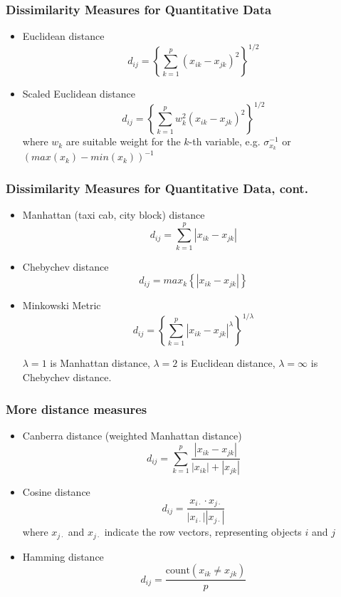 \documentclass{beamer}
\begin{document}
\begin{frame}
  \frametitle{Dissimilarity Measures for Quantitative Data}


\begin{itemize}
\item Euclidean distance
\[
d_{ij} = \left\{ \sum_{k=1}^p (x_{ik} - x_{jk})^2 
         \right\} ^{1/2}
\]


\item Scaled Euclidean distance
\[
d_{ij} = \left\{ \sum_{k=1}^p w_k^2 (x_{ik} - x_{jk})^2 
         \right\} ^{1/2}
\]
where $w_k$ are suitable weight for the $k$-th variable, e.g. $\sigma_{x_k}^{-1}$ or $(max(x_k)-min(x_k))^{-1}$


\end{itemize}
\end{frame}


\begin{frame}
  \frametitle{Dissimilarity Measures for Quantitative Data, cont.}


\begin{itemize}

\item Manhattan (taxi cab, city block) distance
\[
d_{ij} = \sum_{k=1}^p | x_{ik} - x_{jk} |         
\]

\item Chebychev distance
\[
d_{ij} = max_k \left\{ | x_{ik} - x_{jk} | \right\}
\]

\item Minkowski Metric
\[
d_{ij} = \left\{ \sum_{k=1}^p |x_{ik} - x_{jk}|^\lambda
         \right\} ^{1/ \lambda}
\]

$\lambda = 1$ is Manhattan distance, $\lambda = 2$ is Euclidean distance, $\lambda = \infty$ is Chebychev distance.

\end{itemize}
\end{frame}


\begin{frame}
  \frametitle{More distance measures}


\begin{itemize}

\item Canberra distance (weighted Manhattan distance)
\[
d_{ij} = \sum_{k=1}^p \frac{| x_{ik} - x_{jk} |}{|x_{ik}| + |x_{jk}|}
\]

\item Cosine distance
\[
d_{ij} = \frac{x_{i\cdot} \cdot x_{j\cdot}}{|x_{i\cdot}||x_{j\cdot}|}
\]
where $x_{j\cdot}$ and $x_{j\cdot}$ indicate the row vectors, representing objects $i$ and $j$

\item Hamming distance
\[
d_{ij} = \frac{\text{count}(x_{ik} \neq x_{jk})}{p}
\]

\end{itemize}
\end{frame}
\end{document}
